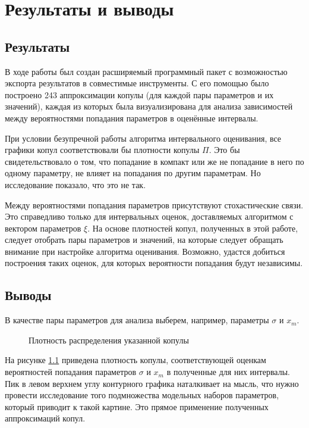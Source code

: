 \chapter{Результаты и выводы}	%

\section*{Результаты}

В ходе работы был создан расширяемый программный пакет с возможностью экспорта результатов в совместимые инструменты. С его помощью было построено 243 аппроксимации копулы (для каждой пары параметров и их значений), каждая из которых была визуализирована для анализа зависимостей между вероятностями попадания параметров в оценённые интервалы.

При условии безупречной работы алгоритма интервального оценивания, все графики копул соответствовали бы плотности копулы $\Pi$. Это бы свидетельствовало о том, что попадание в компакт или же не попадание в него по одному параметру, не влияет на попадания по другим параметрам. Но исследование показало, что это не так.

Между вероятностями попадания параметров присутствуют стохастические связи. Это справедливо только для интервальных оценок, доставляемых алгоритмом с вектором параметров $\xi$. На основе плотностей копул, полученных в этой работе, следует отобрать пары параметров и значений, на которые следует обращать внимание при настройке алгоритма оценивания. Возможно, удастся добиться построения таких оценок, для которых вероятности попадания будут независимы.

\section*{Выводы}

В качестве пары параметров для анализа выберем, например, параметры $\sigma$ и $x_m$.
\begin{figure}[h]
	{}
	\caption{ Плотность распределения указанной копулы}
	\label{fig:smallxm}
\end{figure}
На рисунке \ref{fig:smallxm} приведена плотность копулы, соответствующей оценкам вероятностей попадания параметров $\sigma$ и $x_m$ в полученные для них интервалы. Пик в левом верхнем углу контурного графика наталкивает на мысль, что нужно провести исследование того подмножества модельных наборов параметров, который приводит к такой картине. Это прямое применение полученных аппроксимаций копул.


